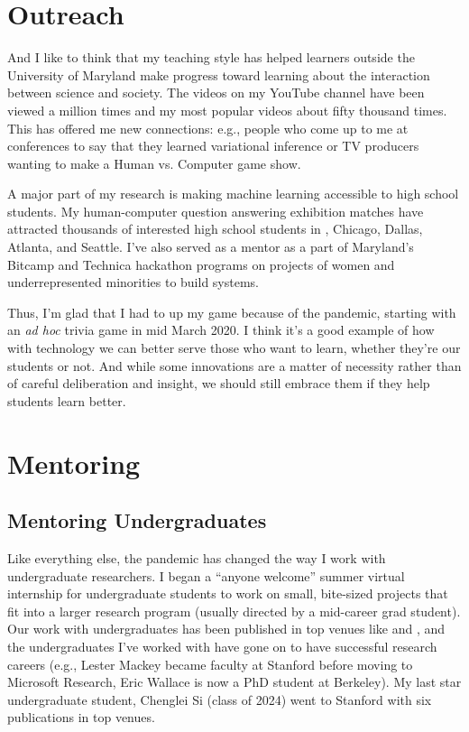 

\section{Outreach}

And I like to think that my teaching style has helped learners outside
the University of Maryland make progress toward learning about the
interaction between science and society.  The videos on my YouTube
channel have been viewed a million times and my most popular videos
about fifty thousand times.  This has offered me new connections:
e.g., people who come up to me at conferences to say that they learned
variational inference or TV producers wanting to make a Human
vs. Computer game show.

A major part of my research is making machine learning accessible to
high school students.
%
My human-computer question answering exhibition matches have attracted
thousands of interested high school students in , Chicago,
Dallas, Atlanta, and Seattle.
%
I've also served as a mentor as a part of Maryland's Bitcamp and
Technica hackathon programs on projects of women and underrepresented
minorities to build  systems.


Thus, I'm glad that I had to up my game because of the pandemic,
starting with an \textit{ad hoc} trivia game in mid March 2020.  I
think it's a good example of how with technology we can better serve
those who want to learn, whether they're our students or not.  And
while some innovations are a matter of necessity rather than of
careful deliberation and insight, we should still embrace them if they
help students learn better.

\section{Mentoring}

\subsection{Mentoring Undergraduates}

Like everything else, the pandemic has changed the way I work with
undergraduate researchers.
%
I began a ``anyone welcome'' summer virtual internship for
undergraduate students to work on small, bite-sized projects that fit
into a larger research program (usually directed by a mid-career grad
student).
%
Our work with undergraduates has been published in top venues like
 and , and the undergraduates I've worked with
have gone on to have successful research careers (e.g., Lester Mackey
became faculty at Stanford before moving to Microsoft Research, Eric
Wallace is now a PhD student at Berkeley).
%
My last star undergraduate student, Chenglei Si (class of 2024)
went to Stanford with six publications in top venues.

